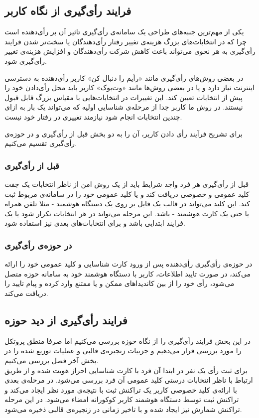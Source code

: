 \subsection{فرایند رأی‌گیری از نگاه کاربر}
یکی از مهم‌ترین جنبه‌های طراحی یک سامانه‌ی رأی‌گیری تاثیر آن بر رأی‌دهنده است چرا که در انتخابات‌های بزرگ هزینه‌ی تغییر رفتار رأی‌دهندگان یا سخت‌تر شدن فرایند رأی‌گیری به هر نحوی می‌تواند باعث کاهش شرکت رأی‌دهندگان و افزایش هزینه‌ی تغییر رأی‌گیری شود.
\par
در بعضی روش‌های رأی‌گیری مانند «رأیم را دنبال کن»
 کاربر رأی‌دهنده به دسترسی اینترنت نیاز دارد و یا در بعضی روش‌‌ها مانند «وت‌بوک»
 \cite{votebook}
  کاربر باید محل رأی‌دادن خود را پیش از انتخابات تعیین کند. این تغییرات در انتخابات‌هایی با مقیاس بزرگ قابل قبول نیستند. در روش ما کاربر جدا از مرحله‌ی شناسایی اولیه که می‌تواند یک بار به ازای چندین انتخابات انجام شود نیازمند تغییری در رفتار خود نیست. 
\par
برای تشریح فرآیند رأی‌ دادن کاربر، آن را به دو بخش قبل از رأی‌گیری و در حوزه‌ی رأی‌گیری تقسیم می‌کنیم. 
\subsubsection{قبل از رأی‌گیری}
قبل از رأی‌گیری هر فرد واجد شرایط باید از یک روش امن از ناظر انتخابات یک جفت کلید عمومی و خصوصی دریافت کند و یا کلید عمومی خود را در سامانه‌ی مربوط ثبت کند. این کلید می‌تواند در قالب یک فایل بر روی یک دستگاه هوشمند - مثلا تلفن همراه یا حتی یک کارت هوشمند - باشد. این مرحله  می‌تواند در هر انتخابات تکرار شود یا یک فرایند ابتدایی باشد و برای انتخابات‌های بعدی نیز استفاده شود. 
\subsubsection{در حوزه‌ی رأی‌گیری}
در حوزه‌ی رأی‌گیری رأی‌دهنده پس از ورود کارت شناسایی و کلید عمومی خود را ارائه می‌کند، در صورت تایید اطلاعات، کاربر با دستگاه هوشمند خود به سامانه‌ حوزه متصل می‌شود، رأی‌ خود را از بین‌ کاندیدا‌های ممکن و یا ممتنع وارد کرده و پیام تایید را دریافت می‌کند. 
\subsection{فرایند رأی‌گیری از دید حوزه‌}
در این بخش فرایند رأی‌گیری را از نگاه حوزه‌ بررسی می‌کنیم اما صرفا منطق پروتکل را مورد بررسی قرار می‌دهیم و جزییات زنجیره‌ی قالبی و عملیات توزیع شده را در بخش آخر فصل بررسی می‌کنیم. 
\\
برای ثبت رأی یک‌ نفر در ابتدا آن فرد با کارت شناسایی احراز هویت شده و از طریق ارتباط با ناظر انتخابات درستی کلید عمومی آن فرد بررسی می‌شود. در مرحله‌ی بعدی با ارائه‌ی کلید خصوصی کاربر یک تراکنش ثبت با نتیجه‌ی مورد نظر ایجاد می‌کند و تراکنش ثبت توسط دستگاه هوشمند کاربر کوکورانه امضاء می‌شود. در این مرحله تراکنش شمارش نیز ایجاد شده و با تاخیر زمانی در زنجیره‌ی قالبی ذخیره می‌شود.

